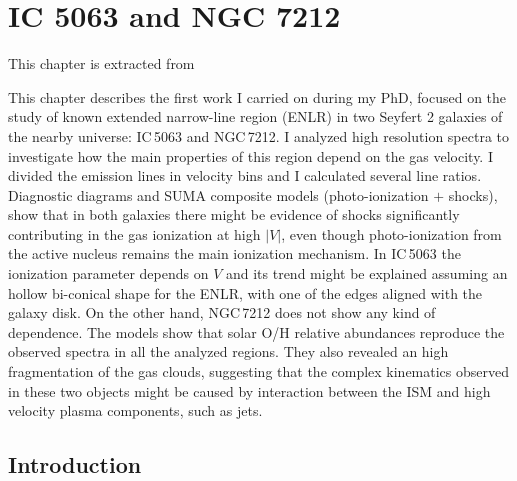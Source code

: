 \documentclass[../main.tex]{subfiles}
\begin{document}
\chapter[IC 5063 and NGC 7212]{IC 5063 and NGC 7212}
\label{cap:paper1}

\epigraph{This chapter is extracted from \citet{Congiu17b}}{}

This chapter describes the first work I carried on during my PhD, focused on the study of known extended narrow-line region (ENLR) in two Seyfert 2 galaxies of the nearby universe: IC\,5063 and NGC\,7212.
I analyzed high resolution spectra to investigate how the main properties of this region depend on the gas velocity.
I divided the emission lines in velocity bins and I calculated several line ratios.
Diagnostic diagrams and SUMA composite models (photo-ionization $+$ shocks), show that in both galaxies there might be evidence of shocks significantly contributing in the gas ionization at high $\lvert V \rvert$, even though photo-ionization from the active nucleus remains the main ionization mechanism.
In IC\,5063 the ionization parameter depends on $V$ and its trend might be explained assuming an hollow bi-conical shape for the ENLR, with one of the edges aligned with the galaxy disk.
On the other hand, NGC\,7212 does not show any kind of dependence.
The models show that solar O/H relative abundances reproduce the observed spectra in all the analyzed regions.
They also revealed an high fragmentation of the gas clouds, suggesting that the complex kinematics observed in these two objects might be caused by interaction between the ISM and high velocity plasma components, such as jets.

\section{Introduction}
\end{document}
